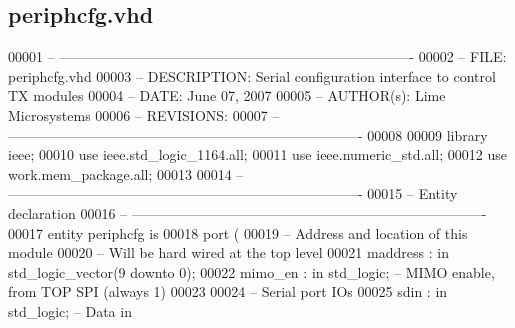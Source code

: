 \subsection{periphcfg.\+vhd}
\label{periphcfg_8vhd_source}

\begin{DoxyCode}
00001 \textcolor{keyword}{-- ---------------------------------------------------------------------------- }
00002 \textcolor{keyword}{-- FILE:    periphcfg.vhd}
00003 \textcolor{keyword}{-- DESCRIPTION: Serial configuration interface to control TX modules}
00004 \textcolor{keyword}{-- DATE:    June 07, 2007}
00005 \textcolor{keyword}{-- AUTHOR(s):   Lime Microsystems}
00006 \textcolor{keyword}{-- REVISIONS:   }
00007 \textcolor{keyword}{-- ---------------------------------------------------------------------------- }
00008 
00009 \textcolor{vhdlkeyword}{library }\textcolor{keywordflow}{ieee};
00010 \textcolor{vhdlkeyword}{use }ieee.std\_logic\_1164.\textcolor{keywordflow}{all};
00011 \textcolor{vhdlkeyword}{use }ieee.numeric\_std.\textcolor{keywordflow}{all};
00012 \textcolor{vhdlkeyword}{use }work.mem_package.\textcolor{keywordflow}{all};
00013 
00014 \textcolor{keyword}{-- ----------------------------------------------------------------------------}
00015 \textcolor{keyword}{-- Entity declaration}
00016 \textcolor{keyword}{-- ----------------------------------------------------------------------------}
00017 \textcolor{keywordflow}{entity }periphcfg \textcolor{keywordflow}{is}
00018     \textcolor{keywordflow}{port} \textcolor{vhdlchar}{(}
00019 \textcolor{keyword}{        -- Address and location of this module}
00020 \textcolor{keyword}{        -- Will be hard wired at the top level}
00021         \textcolor{vhdlchar}{maddress}    \textcolor{vhdlchar}{:} \textcolor{keywordflow}{in} \textcolor{comment}{std\_logic\_vector}\textcolor{vhdlchar}{(}\textcolor{vhdllogic}{}\textcolor{vhdllogic}{9} \textcolor{keywordflow}{downto} \textcolor{vhdllogic}{}\textcolor{vhdllogic}{0}\textcolor{vhdlchar}{)};
00022         \textcolor{vhdlchar}{mimo_en} \textcolor{vhdlchar}{:} \textcolor{keywordflow}{in} \textcolor{comment}{std\_logic};\textcolor{keyword}{ -- MIMO enable, from TOP SPI (always 1)}
00023     
00024 \textcolor{keyword}{        -- Serial port IOs}
00025         \textcolor{vhdlchar}{sdin}    \textcolor{vhdlchar}{:} \textcolor{keywordflow}{in} \textcolor{comment}{std\_logic};\textcolor{keyword}{     -- Data in}

\end{DoxyCode}
